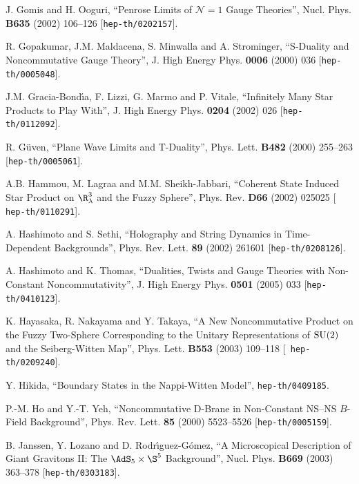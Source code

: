 \begin{thebibliography}{199}
 J. Gomis and H. Ooguri, ``Penrose Limits of
  $\mathcal{N}=1$ Gauge Theories'', Nucl. Phys. {\bf B635} (2002)
  106--126 [{\tt hep-th/0202157}].

 R. Gopakumar, J.M. Maldacena, S. Minwalla and
  A. Strominger, ``S-Duality and Noncommutative Gauge Theory'',
  J. High Energy Phys. {\bf 0006} (2000) 036 [{\tt hep-th/0005048}].

 J.M. Gracia-Bond\'{\i}a, F. Lizzi, G. Marmo and
  P. Vitale, ``Infinitely Many Star Products to Play With'', J. High
  Energy Phys. {\bf 0204} (2002) 026 [{\tt hep-th/0112092}].

 R. G\"uven, ``Plane Wave Limits and T-Duality'',
  Phys. Lett. {\bf B482} (2000) 255--263 [{\tt hep-th/0005061}].

 A.B. Hammou, M. Lagraa and M.M. Sheikh-Jabbari,
  ``Coherent State Induced Star Product on $\R_\lambda^3$ and the
  Fuzzy Sphere'', Phys. Rev. {\bf D66} (2002) 025025 [{\tt
    hep-th/0110291}].

 A. Hashimoto and S. Sethi, ``Holography and String
  Dynamics in Time-Dependent Backgrounds'', Phys. Rev. Lett. {\bf 89}
  (2002) 261601 [{\tt hep-th/0208126}].

 A. Hashimoto and K. Thomas, ``Dualities, Twists and
  Gauge Theories with Non-Constant Noncommutativity'', J. High Energy
  Phys. {\bf 0501} (2005) 033 [{\tt hep-th/0410123}].

 K. Hayasaka, R. Nakayama and Y. Takaya, ``A New
  Noncommutative Product on the Fuzzy Two-Sphere Corresponding to the
  Unitary Representations of ${\rm SU}(2)$ and the Seiberg-Witten
  Map'', Phys. Lett. {\bf B553} (2003) 109--118 [{\tt
    hep-th/0209240}].

 Y. Hikida, ``Boundary States in the Nappi-Witten
  Model'', {\tt hep-th/0409185}.

 P.-M. Ho and Y.-T. Yeh, ``Noncommutative D-Brane in
  Non-Constant NS--NS $B$-Field Background'', Phys. Rev. Lett. {\bf 85}
  (2000) 5523--5526 [{\tt hep-th/0005159}].

 B. Janssen, Y. Lozano and D. Rodr\'{\i}guez-G\'omez,
  ``A Microscopical Description of Giant Gravitons II: The
  $\AdS_5\times\S^5$ Background'', Nucl. Phys. {\bf B669} (2003)
  363--378 [{\tt hep-th/0303183}].


\end{thebibliography}
